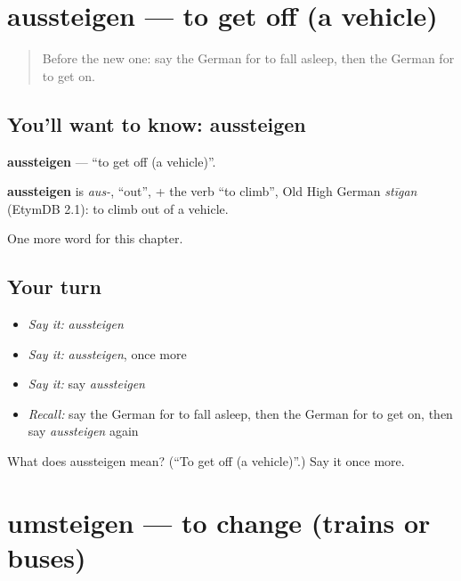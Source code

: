 \section[aussteigen]{aussteigen — to get off (a vehicle)}

\label{lesson:GE-C178-aussteigen}



\begin{quote}
Before the new one: say the German for to fall asleep, then the German for to get on.
\end{quote}

\subsection*{You'll want to know: aussteigen}
\textbf{aussteigen} — \textquotedblleft{}to get off (a vehicle)\textquotedblright{}.

\begin{cousinweb}
\textbf{aussteigen} is \emph{aus-}, \textquotedblleft{}out\textquotedblright{}, + the verb \textquotedblleft{}to climb\textquotedblright{}, Old High German \emph{stīgan} (EtymDB 2.1): to climb out of a vehicle.
\end{cousinweb}

\begin{grammarlens}[title={What you've built}]
One more word for this chapter.
\end{grammarlens}

\subsection*{Your turn}
\begin{itemize}
\raggedright
  \item \emph{Say it:} \emph{aussteigen}
  \item \emph{Say it:} \emph{aussteigen}, once more
  \item \emph{Say it:} say \emph{aussteigen}
  \item \emph{Recall:} say the German for to fall asleep, then the German for to get on, then say \emph{aussteigen} again
\end{itemize}

\begin{tcolorbox}[breakable,colback=teal!4,colframe=teal!35!black,title={Before you move on}]
What does aussteigen mean? (\textquotedblleft{}To get off (a vehicle)\textquotedblright{}.) Say it once more.
\end{tcolorbox}
\section[umsteigen]{umsteigen — to change (trains or buses)}

